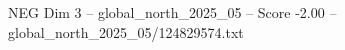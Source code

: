 \begin{textsample}{NEG Dim 3 – global\_north\_2025\_05 – Score -2.00 – global\_north\_2025\_05/124829574.txt}
\end{textsample}
